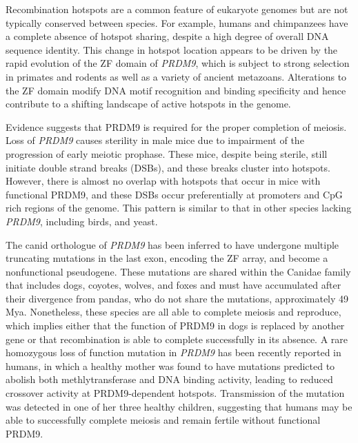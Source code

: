 Recombination hotspots are a common feature of eukaryote genomes but are not typically conserved between species.
For example, humans and chimpanzees have a complete absence of hotspot sharing, despite a high degree of overall DNA sequence identity\cite{Ptak2005,Winckler2005,Auton2012a}.
This change in hotspot location appears to be driven by the rapid evolution of the
ZF domain of \textit{PRDM9}, which is subject to strong selection in primates and rodents as well as a variety of ancient metazoans\cite{Oliver2009}.
Alterations to the ZF domain modify DNA motif recognition and binding specificity\cite{Oliver2009}
and hence contribute to a shifting landscape of active hotspots in the genome.

Evidence suggests that PRDM9 is required for the proper completion of meiosis.
Loss of \textit{PRDM9} causes sterility in male mice due to impairment of the progression of early meiotic prophase\cite{Hayashi2005}.
These mice, despite being sterile, still initiate double strand breaks (DSBs), and these breaks cluster into hotspots.
However, there is almost no overlap with hotspots that occur in mice with functional PRDM9, and these DSBs occur preferentially at promoters and CpG rich regions of the genome\cite{Brick2012}.  %
This pattern is similar to that in other species lacking \textit{PRDM9}, including birds\cite{Singhal2015}, and yeast\cite{Lam2015}. %

The canid orthologue of \textit{PRDM9} has been inferred to have undergone multiple truncating mutations in the last exon, encoding the ZF array, and become a nonfunctional pseudogene\cite{Munoz-Fuentes2011}.
These mutations are shared within the Canidae family that includes dogs, coyotes, wolves, and foxes and must have accumulated after their divergence from pandas, who do not share the mutations, approximately 49 Mya\cite{Oliver2009,Munoz-Fuentes2011,Axelsson2012,Auton2013}.
Nonetheless, these species are all able to complete meiosis and reproduce,
which implies either that the function of PRDM9 in dogs is replaced by another gene or that recombination is able to complete successfully in its absence.
A rare homozygous loss of function mutation in \textit{PRDM9} has been recently reported in humans, in which a healthy mother was found to have mutations predicted to abolish both methlytransferase and DNA binding activity\cite{Narasimhan2016}, leading to 
 reduced crossover activity at PRDM9-dependent hotspots.
Transmission of the mutation was detected in one of her three healthy children, suggesting that humans may be able to successfully complete meiosis and remain fertile without functional PRDM9.

